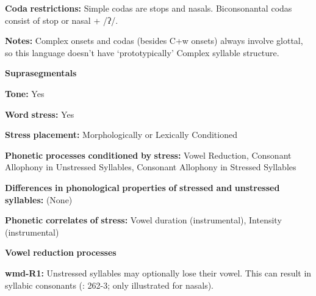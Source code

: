 \documentclass[output=paper]{langsci/langscibook}
\begin{document}
\begin{styleBody}
\textbf{Coda} \textbf{restrictions:} Simple codas are stops and nasals. Biconsonantal codas consist of stop or nasal + /ʔ/.
\end{styleBody}

\begin{styleBody}
\textbf{Notes:} Complex onsets and codas (besides C+w onsets) always involve glottal, so this language doesn’t have ‘prototypically’ Complex syllable structure.
\end{styleBody}

\begin{styleBody}
\textbf{Suprasegmentals}
\end{styleBody}

\begin{styleBody}
\textbf{Tone:} Yes
\end{styleBody}

\begin{styleBody}
\textbf{Word} \textbf{stress:} Yes
\end{styleBody}

\begin{styleBody}
\textbf{Stress} \textbf{placement:} Morphologically or Lexically Conditioned
\end{styleBody}

\begin{styleBody}
\textbf{Phonetic} \textbf{processes} \textbf{conditioned} \textbf{by} \textbf{stress:} Vowel Reduction, Consonant Allophony in Unstressed Syllables, Consonant Allophony in Stressed Syllables
\end{styleBody}

\begin{styleBody}
\textbf{Differences} \textbf{in} \textbf{phonological} \textbf{properties} \textbf{of} \textbf{stressed} \textbf{and} \textbf{unstressed} \textbf{syllables:} (None)
\end{styleBody}

\begin{styleBody}
\textbf{Phonetic} \textbf{correlates} \textbf{of} \textbf{stress:} Vowel duration (instrumental), Intensity (instrumental)
\end{styleBody}

\begin{styleBody}
\textbf{Vowel} \textbf{reduction} \textbf{processes}
\end{styleBody}

\begin{styleBody}
\textbf{wmd-R1:} Unstressed syllables may optionally lose their vowel. This can result in syllabic consonants (\citealt{Eberhard2009}: 262-3; only illustrated for nasals).
\end{styleBody}
\end{document}
